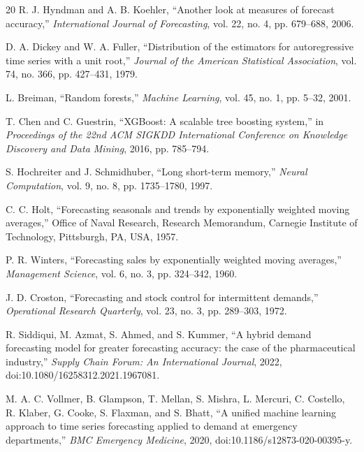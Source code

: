 \documentclass[conference]{IEEEtran}
\begin{document}
\begin{thebibliography}{20}
 R. J. Hyndman and A. B. Koehler, ``Another look at measures of forecast accuracy,'' \textit{International Journal of Forecasting}, vol. 22, no. 4, pp. 679--688, 2006.

 D. A. Dickey and W. A. Fuller, ``Distribution of the estimators for autoregressive time series with a unit root,'' \textit{Journal of the American Statistical Association}, vol. 74, no. 366, pp. 427--431, 1979.

 L. Breiman, ``Random forests,'' \textit{Machine Learning}, vol. 45, no. 1, pp. 5--32, 2001.

 T. Chen and C. Guestrin, ``XGBoost: A scalable tree boosting system,'' in \textit{Proceedings of the 22nd ACM SIGKDD International Conference on Knowledge Discovery and Data Mining}, 2016, pp. 785--794.

 S. Hochreiter and J. Schmidhuber, ``Long short-term memory,'' \textit{Neural Computation}, vol. 9, no. 8, pp. 1735--1780, 1997.

 C. C. Holt, ``Forecasting seasonals and trends by exponentially weighted moving averages,'' Office of Naval Research, Research Memorandum, Carnegie Institute of Technology, Pittsburgh, PA, USA, 1957.

 P. R. Winters, ``Forecasting sales by exponentially weighted moving averages,'' \textit{Management Science}, vol. 6, no. 3, pp. 324--342, 1960.

 J. D. Croston, ``Forecasting and stock control for intermittent demands,'' \textit{Operational Research Quarterly}, vol. 23, no. 3, pp. 289--303, 1972.

 R. Siddiqui, M. Azmat, S. Ahmed, and S. Kummer, ``A hybrid demand forecasting model for greater forecasting accuracy: the case of the pharmaceutical industry,'' \textit{Supply Chain Forum: An International Journal}, 2022, doi:10.1080/16258312.2021.1967081.

 M. A. C. Vollmer, B. Glampson, T. Mellan, S. Mishra, L. Mercuri, C. Costello, R. Klaber, G. Cooke, S. Flaxman, and S. Bhatt, ``A unified machine learning approach to time series forecasting applied to demand at emergency departments,'' \textit{BMC Emergency Medicine}, 2020, doi:10.1186/s12873-020-00395-y.

\end{thebibliography}
\end{document}
